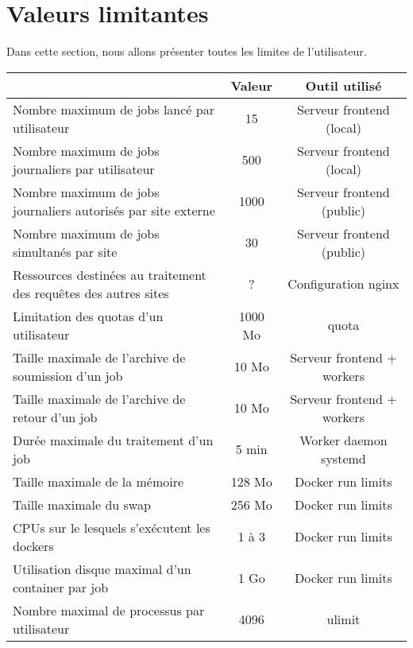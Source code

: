 \section{Valeurs limitantes}

Dans cette section, nous allons présenter toutes les limites de l'utilisateur.


\begin{center}
	\begin{tabular}{| L{8cm} | c | c |}
		\hline
		  & {\bf Valeur} & {\bf Outil utilisé} \\ \hline
		Nombre maximum de jobs lancé par utilisateur & 15 & Serveur frontend (local) \\ \hline %
		Nombre maximum de jobs journaliers par utilisateur & 500 & Serveur frontend (local) \\ \hline %
		Nombre maximum de jobs journaliers autorisés par site externe & 1000 & Serveur frontend (public) \\ \hline %
		Nombre maximum de jobs simultanés par site & 30 & Serveur frontend (public) \\ \hline %
		Ressources destinées au traitement des requêtes des autres sites & ? & Configuration nginx \\ \hline %
		Limitation des quotas d'un utilisateur & 1000 Mo & quota \\ \hline %
		Taille maximale de l'archive de soumission d'un job & 10 Mo & Serveur frontend + workers \\ \hline %
		Taille maximale de l'archive de retour d'un job & 10 Mo & Serveur frontend + workers \\ \hline %
		Durée maximale du traitement d'un job & 5 min & Worker daemon systemd \\ \hline %
		Taille maximale de la mémoire & 128 Mo & Docker run limits \\ \hline %
		Taille maximale du swap & 256 Mo & Docker run limits \\ \hline %
		CPUs sur le lesquels s'exécutent les dockers & 1 à 3 & Docker run limits \\ \hline %
		Utilisation disque maximal d'un container par job & 1 Go & Docker run limits \\ \hline %
		Nombre maximal de processus par utilisateur & 4096 & ulimit \\ \hline %
	\end{tabular}
\end{center}
